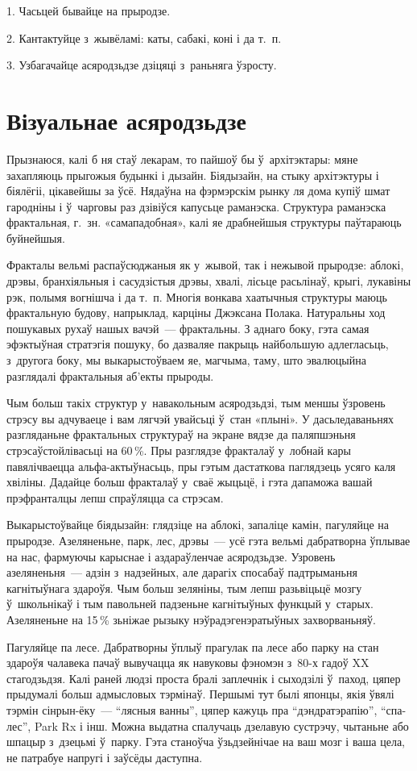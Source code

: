 1. Часьцей бывайце на прыродзе.

2. Кантактуйце з~жывёламі: каты, сабакі, коні і да т.~п.

3. Узбагачайце асяродзьдзе дзіцяці з~раньняга ўзросту.


\section{Візуальнае асяродзьдзе}

Прызнаюся, калі б ня стаў лекарам, то пайшоў бы ў~архітэктары: мяне захапляюць прыгожыя будынкі і дызайн. Біядызайн, на стыку архітэктуры і біялёгіі, цікавейшы за ўсё. Нядаўна на фэрмэрскім рынку ля дома купіў шмат гародніны і ў~чарговы раз дзівіўся капусьце раманэска. Структура раманэска фрактальная, г.~зн. «самападобная», калі яе драбнейшыя структуры паўтараюць буйнейшыя.

Фракталы вельмі распаўсюджаныя як у~жывой, так і нежывой прыродзе: аблокі, дрэвы, бранхіяльныя і сасудзістыя дрэвы, хвалі, лісьце расьлінаў, крыгі, лукавіны рэк, полымя вогнішча і да т.~п. Многія вонкава хаатычныя структуры маюць фрактальную будову, напрыклад, карціны Джэксана Полака. Натуральны ход пошукавых рухаў нашых вачэй~--- фрактальны. З аднаго боку, гэта самая эфэктыўная стратэгія пошуку, бо дазваляе пакрыць найбольшую адлегласьць, з~другога боку, мы выкарыстоўваем яе, магчыма, таму, што эвалюцыйна разглядалі фрактальныя аб'екты прыроды. 

Чым больш такіх структур у~навакольным асяродзьдзі, тым меншы ўзровень стрэсу вы адчуваеце і вам лягчэй увайсьці ў~стан «плыні». У дасьледаваньнях разгляданьне фрактальных структураў на экране вядзе да паляпшэньня стрэсаўстойлівасьці на 60\,\%. Пры разглядзе фракталаў у~лобнай кары павялічваецца альфа-актыўнасьць, пры гэтым дастаткова паглядзець усяго каля хвіліны. Дадайце больш фракталаў у~сваё жыцьцё, і гэта дапаможа вашай прэфранталцы лепш спраўляцца са стрэсам.

Выкарыстоўвайце біядызайн: глядзіце на аблокі, запаліце камін, пагуляйце на прыродзе. Азеляненьне, парк, лес, дрэвы~--- усё гэта вельмі дабратворна ўплывае на нас, фармуючы карыснае і аздараўленчае асяродзьдзе. Узровень азеляненьня~--- адзін з~надзейных, але дарагіх спосабаў падтрыманьня кагнітыўнага здароўя. Чым больш зеляніны, тым лепш разьвіцьцё мозгу ў~школьнікаў і тым павольней падзеньне кагнітыўных функцый у~старых. Азеляненьне на 15\,\% зьніжае рызыку нэўрадэгенэратыўных захворваньняў.

Пагуляйце па лесе. Дабратворны ўплыў прагулак па лесе або парку на стан здароўя чалавека пачаў вывучацца як навуковы фэномэн з~80-х гадоў XX стагодзьдзя. Калі раней людзі проста бралі заплечнік і сыходзілі ў~паход, цяпер прыдумалі больш адмысловых тэрмінаў. Першымі тут былі японцы, якія ўвялі тэрмін сінрын-ёку~--- ``лясныя ванны'', цяпер кажуць пра ``дэндратэрапію'', ``спа-лес'', Park Rx і інш. Можна выдатна спалучаць дзелавую сустрэчу, чытаньне або шпацыр з~дзецьмі ў~парку. Гэта станоўча ўзьдзейнічае на ваш мозг і ваша цела, не патрабуе напругі і заўсёды даступна.

